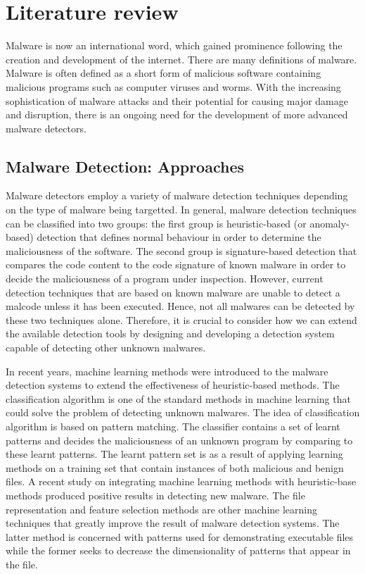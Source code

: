 \section{Literature review}

Malware is now an international word, which gained prominence following the
creation and development of the internet. There are many definitions of
malware. Malware is often defined as a short form of malicious software 
containing malicious programs such as computer viruses and worms. With the
increasing sophistication of malware attacks and their potential for causing
major damage and disruption, there is an ongoing need for the development of
more advanced malware detectors\cite{Malware-tech}.

\subsection{Malware Detection: Approaches}

Malware detectors employ a variety of malware detection techniques depending on
the type of malware being targetted. In general, malware detection techniques
can be classified into two groups: the first group is heuristic-based (or
anomaly-based) detection that defines normal behaviour in order to determine
the maliciousness of the software. The second group is signature-based
detection that compares the code content to the code signature of known malware in
order to decide the maliciousness of a program under inspection. However,
current detection techniques that are based on known malware are unable to
detect a malcode unless it has been executed. Hence, not all malwares can
be detected by these two techniques alone. Therefore, it is crucial to consider how
we can extend the available detection tools by designing and developing a
detection system capable of detecting other unknown
malwares\cite{Malware-tech}.
 

In recent years, machine learning methods were introduced to the malware
detection systems to extend the effectiveness of heuristic-based methods. The
classification algorithm is one of the standard methods in machine learning
that could solve the problem of detecting unknown malwares\cite{Machin-lear}.
The idea of classification algorithm is based on pattern matching. The
classifier contains a set of learnt patterns and decides the maliciousness of
an unknown program by comparing to these learnt patterns. The learnt pattern set is as
a result of applying learning methods on a training set that contain instances
of both malicious and benign files. A recent study on integrating machine
learning methods with heuristic-base methods produced positive results in
detecting new malware\cite{Machin-lear}. The file representation and feature
selection methods are other machine learning techniques that greatly improve
the result of malware detection systems. The latter method is concerned with
patterns used for demonstrating executable files while the former seeks to
decrease the dimensionality of patterns that appear in the
file\cite{Machin-lear}.


